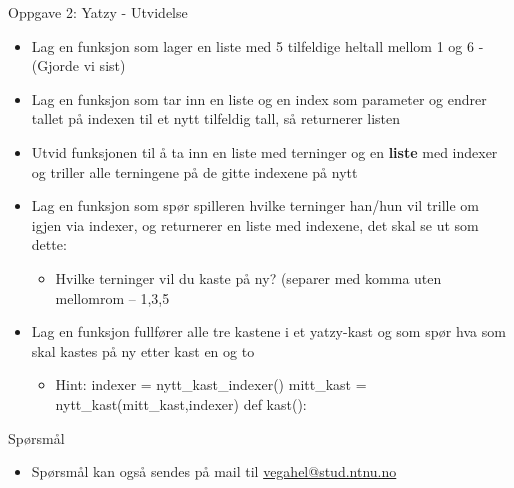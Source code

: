 \documentclass[screen, aspectratio=169]{beamer}
\begin{document}
\begin{frame}{Oppgave 2: Yatzy - Utvidelse}
	\begin{itemize}
		\item<+-> Lag en funksjon som lager en liste med 5 tilfeldige heltall mellom 1 og 6 - (Gjorde vi sist)
	
		\item<+-> Lag en funksjon som tar inn en liste og en index som parameter og endrer tallet på indexen til et nytt tilfeldig tall, så returnerer listen

		\item<+-> Utvid funksjonen til å ta inn en liste med terninger og en \textbf{liste} med indexer og triller alle terningene på de gitte indexene på nytt

		\item<+->  Lag en funksjon som spør spilleren hvilke terninger han/hun vil trille om igjen via indexer, og returnerer en liste med indexene, det skal se ut som dette:
		\begin{itemize}
    \item   Hvilke terninger vil du kaste på ny? (separer med komma uten mellomrom – 1,3,5
    \end{itemize}
    \item<+-> Lag en funksjon fullfører alle tre kastene i et yatzy-kast og som spør hva som skal kastes på ny etter kast en og to
    \begin{itemize}
        \item Hint: indexer = nytt\_kast\_indexer()
	mitt\_kast = nytt\_kast(mitt\_kast,indexer)
	def kast():

    \end{itemize}

	\end{itemize}
\end{frame}



\begin{frame}{Spørsmål}
	\begin{itemize}
		\item Spørsmål kan også sendes på mail til \href{mailto::vegahel@stud.ntnu.no}{vegahel@stud.ntnu.no}
	\end{itemize}
\end{frame}
\end{document}
